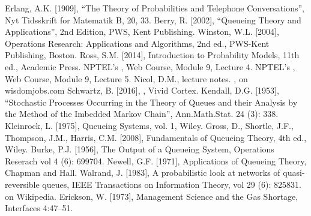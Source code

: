 \begin{thebibliography}{99}
 Erlang, A.K. [1909], ``The Theory of Probabilities and Telephone Conversations'', Nyt Tidsskrift for Matematik B, 20, 33.
 Berry, R. [2002], ``Queueing Theory and Applications'', 2nd Edition, PWS, Kent Publishing.
 Winston, W.L. [2004], Operations Research: Applications and Algorithms, 2nd ed., PWS-Kent Publishing, Boston.
 Ross, S.M. [2014], Introduction to Probability Models,  11th ed., Academic Press. 
 NPTEL's , Web Course, Module 9, Lecture 4.
 NPTEL's , Web Course, Module 9, Lecture 5.
 Nicol, D.M.,  lecture notes.
 , on wisdomjobs.com
Schwartz, B. [2016],  , Vivid Cortex.
 Kendall, D.G. [1953], ``Stochastic Processes Occurring in the Theory of Queues and their Analysis by the Method of the Imbedded Markov Chain'', Ann.Math.Stat. 24 (3): 338.
 Kleinrock, L. [1975], Queueing Systems, vol. 1, Wiley.
 Gross, D., Shortle, J.F., Thompson, J.M., Harris, C.M. [2008], Fundamentals of Queueing Theory, 4th ed., Wiley.
 Burke, P.J. [1956], The Output of a Queueing System, Operations Reserach vol 4 (6): 699704.
 Newell, G.F. [1971], Applications of Queueing Theory, Chapman and Hall.
 Walrand, J. [1983], A probabilistic look at networks of quasi-reversible queues, IEEE Transactions on Information Theory, vol 29 (6): 825831.
  on Wikipedia.
 Erickson, W. [1973], Management Science and the Gas Shortage, Interfaces 4:47–51.
\end{thebibliography}




